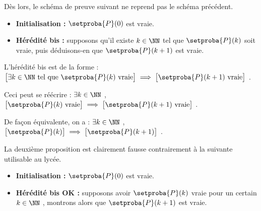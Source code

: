 \documentclass[12pt]{amsart}
\begin{document}
\bigskip

Dès lors, le schéma de preuve suivant ne reprend pas le schéma précédent.
	
	\begin{itemize}[label=\small\textbullet]
		\item \textbf{Initialisation :}
		      $\setproba{P}(0)$ est vraie.

		\item \textbf{Hérédité bis :}
		      supposons qu'il existe $k \in \NN$ tel que $\setproba{P}(k)$ soit vraie, puis déduisons-en que $\setproba{P}(k+1)$ est vraie.
	\end{itemize}

L'hérédité bis est de la forme :
$\big[ \exists k \in \NN \text{ tel que } \setproba{P}(k) \text{ vraie} \big] \implies \big[ \setproba{P}(k+1) \text{ vraie} \big]$ .

Ceci peut se réécrire :
$\exists k \in \NN$ , $\big[ \setproba{P}(k) \text{ vraie} \big] \implies \big[ \setproba{P}(k+1) \text{ vraie} \big]$ .

De façon équivalente, on a :
$\exists k \in \NN$ , $\big[ \setproba{P}(k) \big] \implies \big[ \setproba{P}(k+1) \big]$ . 

\medskip

La deuxième proposition est clairement fausse contrairement à la suivante utilisable au lycée.
	
	\begin{itemize}[label=\small\textbullet]
		\item \textbf{Initialisation :}
		      $\setproba{P}(0)$ est vraie.

		\item \textbf{Hérédité bis OK :}
		      supposons avoir $\setproba{P}(k)$ vraie pour un certain $k \in \NN$ , montrons alors que $\setproba{P}(k+1)$ est vraie.
	\end{itemize}
\end{document}
